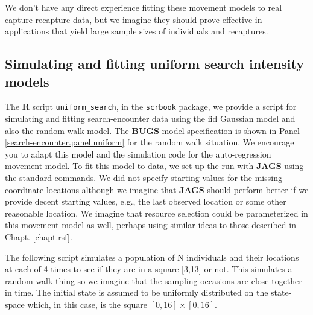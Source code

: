 We don't have any direct experience fitting these movement models to
real capture-recapture data, but we imagine they should prove
effective in applications that yield large sample sizes of individuals
and recaptures. 

\subsection{Simulating and fitting uniform search intensity models}

The {\bf R} script \mbox{\tt uniform\_search}, in the \mbox{\tt scrbook} package, we provide a script for simulating
and fitting search-encounter data using the iid Gaussian model and
also the random walk model.  The {\bf BUGS} model specification is
shown in Panel \ref{search-encounter.panel.uniform} for the random
walk situation. We encourage you to adapt this model and the
simulation code for the auto-regression movement model.  To fit this
model to data, we set up the run with {\bf JAGS} using the standard
commands. We did not specify starting values for the missing
coordinate locations although we imagine that {\bf JAGS} should
perform better if we provide decent starting values, e.g., the last
observed location or some other reasonable location.  We imagine that
resource selection could be parameterized in this movement model as
well, perhaps using similar ideas to those described in
Chapt. \ref{chapt.rsf}.

The following script simulates a population of N individuals and their
locations at each of 4 times to see if they are in a square [3,13] or
not.  This simulates a random walk thing so we imagine that the
sampling occasions are close together in time.  The initial state is
assumed to be uniformly distributed on the state-space which, in this
case, is the square $[0,16] \times [0,16]$.

